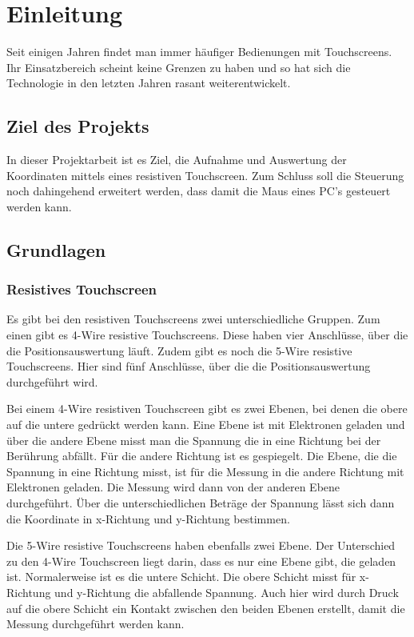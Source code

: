 \chapter{Einleitung}
Seit einigen Jahren findet man immer häufiger Bedienungen mit Touchscreens.
Ihr Einsatzbereich scheint keine Grenzen zu haben und so hat sich die Technologie in den letzten Jahren rasant weiterentwickelt.


\section{Ziel des Projekts}
In dieser Projektarbeit ist es Ziel, die Aufnahme und Auswertung der Koordinaten mittels eines resistiven Touchscreen.
Zum Schluss soll die Steuerung noch dahingehend erweitert werden, dass damit die Maus eines PC's gesteuert werden kann.


\section{Grundlagen}
\subsection{Resistives Touchscreen}
Es gibt bei den resistiven Touchscreens zwei unterschiedliche Gruppen.
Zum einen gibt es 4-Wire resistive Touchscreens.
Diese haben vier Anschlüsse, über die die Positionsauswertung läuft.
Zudem gibt es noch die 5-Wire resistive Touchscreens.
Hier sind fünf Anschlüsse, über die die Positionsauswertung durchgeführt wird.

Bei einem 4-Wire resistiven Touchscreen gibt es zwei Ebenen, bei denen die obere auf die untere gedrückt werden kann.
Eine Ebene ist mit Elektronen geladen und über die andere Ebene misst man die Spannung die in eine Richtung bei der Berührung abfällt.
Für die andere Richtung ist es gespiegelt.
Die Ebene, die die Spannung in eine Richtung misst, ist für die Messung in die andere Richtung mit Elektronen geladen.
Die Messung wird dann von der anderen Ebene durchgeführt.
Über die unterschiedlichen Beträge der Spannung lässt sich dann die Koordinate in x-Richtung und y-Richtung bestimmen.

Die 5-Wire resistive Touchscreens haben ebenfalls zwei Ebene.
Der Unterschied zu den 4-Wire Touchscreen liegt darin, dass es nur eine Ebene gibt, die geladen ist.
Normalerweise ist es die untere Schicht.
Die obere Schicht misst  für x-Richtung und y-Richtung die abfallende Spannung.
Auch hier wird durch Druck auf die obere Schicht ein Kontakt zwischen den beiden Ebenen erstellt, damit die Messung durchgeführt werden kann.

